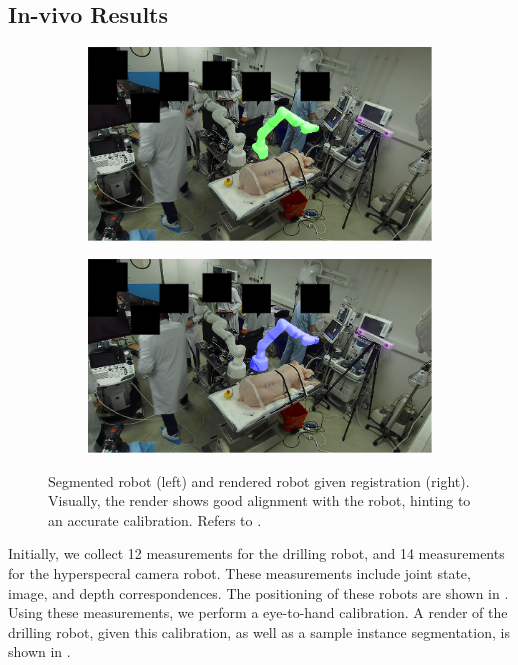 \subsection{In-vivo Results}
\label{c1:sec:in_vivo_results}
\begin{figure}[tb]
    \centering
    \begin{subfigure}[b]{0.49\textwidth}
        \centering
        \includegraphics[width=\textwidth]{chapter_1/img/left_mask_overlay_0_anonymized.png}
    \end{subfigure}
    \begin{subfigure}[b]{0.49\textwidth}
        \includegraphics[width=\textwidth]{chapter_1/img/left_render_0_anonymized.png}
    \end{subfigure}
    \caption{Segmented robot (left) and rendered robot given registration (right). Visually, the render shows good alignment with the robot, hinting to an accurate calibration. Refers to .}
    \label{c1:fig:in_vivo_results}
\end{figure}
Initially, we collect 12 measurements for the drilling robot, and 14 measurements for the hyperspecral camera robot. These measurements include joint state, image, and depth correspondences. The positioning of these robots are shown in . Using these measurements, we perform a eye-to-hand calibration. A render of the drilling robot, given this calibration, as well as a sample instance segmentation, is shown in . 

